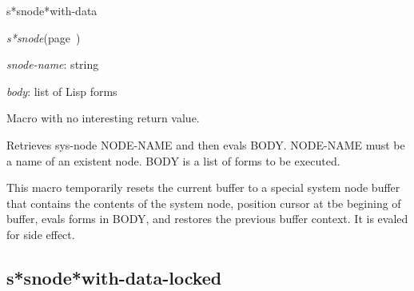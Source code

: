 \begin{description}
\item [Name:]  s*snode*with-data

\item [Class:]
{\sl s*snode}\hfill(page~\pageref{s*snode})

\item [Parameters:]
\item {\sl snode-name}:  string

\item {\sl body}:  list of Lisp forms


\item [Return-value:] 
Macro with no interesting return value.

\item [Description:]
Retrieves sys-node NODE-NAME and then evals BODY.
NODE-NAME must be a name of an existent node. 
BODY is a list of forms to be executed. 

This macro temporarily resets the current buffer to a
special system node buffer that contains the contents of
the system node, position cursor at tbe begining of
buffer, evals forms in BODY, and restores the
previous buffer context. It is evaled for side effect. 

\item [Public:]




\end{description}
\horizontalline

\subsection{s*snode*with-data-locked}
\label{s*snode*with-data-locked}

